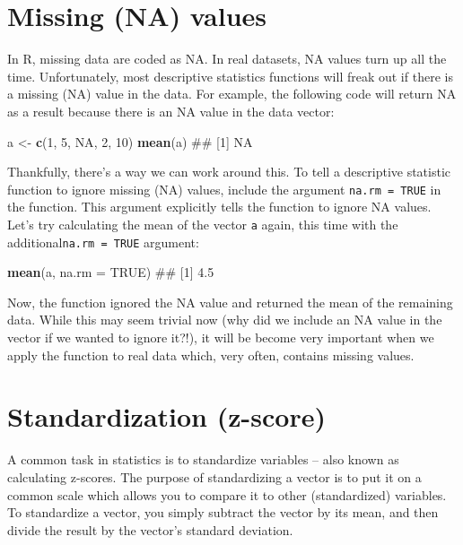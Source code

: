 \documentclass[]{book}
\newenvironment{Shaded}{\begin{snugshade}}{\end{snugshade}}
\newcommand{\KeywordTok}[1]{\textcolor[rgb]{0.13,0.29,0.53}{\textbf{{#1}}}}
\newcommand{\DataTypeTok}[1]{\textcolor[rgb]{0.13,0.29,0.53}{{#1}}}
\newcommand{\DecValTok}[1]{\textcolor[rgb]{0.00,0.00,0.81}{{#1}}}
\newcommand{\StringTok}[1]{\textcolor[rgb]{0.31,0.60,0.02}{{#1}}}
\newcommand{\OtherTok}[1]{\textcolor[rgb]{0.56,0.35,0.01}{{#1}}}
\newcommand{\NormalTok}[1]{{#1}}
\theoremstyle{definition}
\theoremstyle{definition}
\theoremstyle{remark}
\begin{document}
\section{Missing (NA) values}\label{missing-na-values}

In R, missing data are coded as NA. In real datasets, NA values turn up
all the time. Unfortunately, most descriptive statistics functions will
freak out if there is a missing (NA) value in the data. For example, the
following code will return NA as a result because there is an NA value
in the data vector:

\begin{Shaded}
\begin{Highlighting}[]
\NormalTok{a <-}\StringTok{ }\KeywordTok{c}\NormalTok{(}\DecValTok{1}\NormalTok{, }\DecValTok{5}\NormalTok{, }\OtherTok{NA}\NormalTok{, }\DecValTok{2}\NormalTok{, }\DecValTok{10}\NormalTok{)}
\KeywordTok{mean}\NormalTok{(a)}
\NormalTok{## [1] NA}
\end{Highlighting}
\end{Shaded}

Thankfully, there's a way we can work around this. To tell a descriptive
statistic function to ignore missing (NA) values, include the argument
\texttt{na.rm\ =\ TRUE} in the function. This argument explicitly tells
the function to ignore NA values. Let's try calculating the mean of the
vector \texttt{a} again, this time with the
additional\texttt{na.rm\ =\ TRUE} argument:

\begin{Shaded}
\begin{Highlighting}[]
\KeywordTok{mean}\NormalTok{(a, }\DataTypeTok{na.rm =} \OtherTok{TRUE}\NormalTok{)}
\NormalTok{## [1] 4.5}
\end{Highlighting}
\end{Shaded}

Now, the function ignored the NA value and returned the mean of the
remaining data. While this may seem trivial now (why did we include an
NA value in the vector if we wanted to ignore it?!), it will be become
very important when we apply the function to real data which, very
often, contains missing values.

\section{Standardization (z-score)}\label{standardization-z-score}

A common task in statistics is to standardize variables -- also known as
calculating z-scores. The purpose of standardizing a vector is to put it
on a common scale which allows you to compare it to other (standardized)
variables. To standardize a vector, you simply subtract the vector by
its mean, and then divide the result by the vector's standard deviation.
\end{document}
